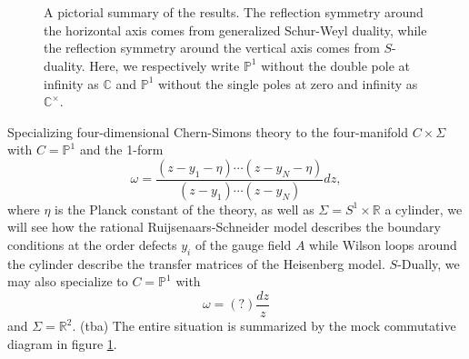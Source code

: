\documentclass[11pt]{report}
\theoremstyle{definition}
\theoremstyle{remark}
\theoremstyle{remark}
\newcommand{\R}{\mathbb{R}}
\newcommand{\C}{\mathbb{C}}
\renewcommand{\P}{\mathbb{P}}
\begin{document}
\begin{figure}
\begin{center}
~\\~\\
\end{center}
\caption{A pictorial summary of the results. The reflection symmetry around the horizontal axis comes from generalized Schur-Weyl duality, while the reflection symmetry around the vertical axis comes from $S$-duality. Here, we respectively write $\P^1$ without the double pole at infinity as $\C$ and $\P^1$ without the single poles at zero and infinity as $\C^\times$.}
\label{figure:dualities}
\end{figure}

Specializing four-dimensional Chern-Simons theory to the four-manifold $C \times \Sigma$ with $C = \P^1$ and the 1-form
\begin{equation*}
\omega = \frac{(z-y_1-\eta) \cdots (z-y_N-\eta)}{(z-y_1) \cdots (z-y_N)} dz,
\end{equation*}
where $\eta$ is the Planck constant of the theory, as well as $\Sigma = S^1 \times \R$ a cylinder, we will see how the rational Ruijsenaars-Schneider model describes the boundary conditions at the order defects $y_i$ of the gauge field $A$ while Wilson loops around the cylinder describe the transfer matrices of the Heisenberg model. $S$-Dually, we may also specialize to $C = \P^1$ with
\begin{equation*}
\omega = (?) \frac{dz}{z}
\end{equation*}
and $\Sigma = \R^2$. (tba) The entire situation is summarized by the mock commutative diagram in figure \ref{figure:dualities}.
\end{document}
